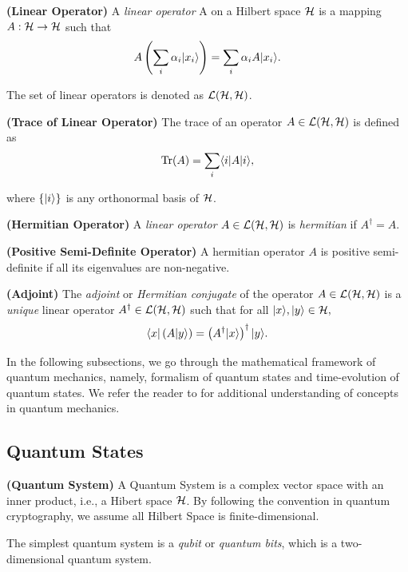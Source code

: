 \begin{definition}\textbf{(Linear Operator)}
A \emph{linear operator} A on a Hilbert space $\mathcal{H}$ is a mapping $A:\mathcal{H}\rightarrow\mathcal{H}$ such that
\[A\left(\sum_i \alpha_i |x_i \rangle\right) = \sum_i \alpha_i A|x_i \rangle.\]

The set of linear operators is denoted as $\mathcal{L}(\mathcal{H},\mathcal{H})$.
\end{definition}

\begin{definition}\textbf{(Trace of Linear Operator)}
The trace of an operator $A \in \mathcal{L}(\mathcal{H},\mathcal{H})$ is defined as
\[\operatorname{Tr}(A) = \sum_i \langle i|A|i \rangle,\]

where $\{|i \rangle\}$ is any orthonormal basis of $\mathcal{H}$.
\end{definition}

\begin{definition}\textbf{(Hermitian Operator)}
A \emph{linear operator} $A \in \mathcal{L}(\mathcal{H},\mathcal{H})$ is \textit{hermitian} if $A^\dagger = A$. 
\end{definition}

\begin{definition}\textbf{(Positive Semi-Definite Operator)} A hermitian operator $A$ is positive semi-definite if all its eigenvalues are non-negative. 
\end{definition}

\begin{definition}\textbf{(Adjoint)} The \emph{adjoint} or \emph{Hermitian conjugate} of the operator $A \in \mathcal{L}(\mathcal{H},\mathcal{H})$ is a \emph{unique} linear operator $A^{\dagger} \in \mathcal{L}(\mathcal{H},\mathcal{H})$ such that for all $|x \rangle,|y \rangle \in \mathcal{H},$ 
\[\langle x| \left(A|y \rangle\right) = \left(A^\dagger|x \rangle\right)^\dagger|y \rangle.\]
\end{definition}


In the following subsections, we go through the mathematical framework of quantum mechanics, namely, formalism of quantum states and time-evolution of quantum states. We refer the reader to \cite{sakurai1995modern, zettili2003quantum, griffiths2018introduction} for additional understanding of concepts in quantum mechanics.
\subsection{Quantum States}
\begin{definition}\textbf{(Quantum System)} A Quantum System is a complex vector space with an inner product, i.e., a Hibert space $\mathcal{H}$. By following the convention in quantum cryptography, we assume all Hilbert Space is finite-dimensional. 
\begin{example}
    The simplest quantum system is a \textit{qubit} or \textit{quantum bits}, which is a two-dimensional quantum system. 
\end{example}
\end{definition}

